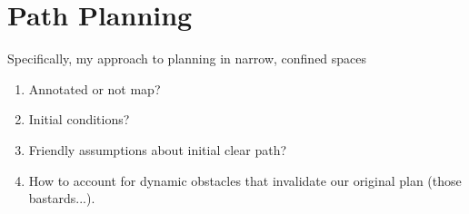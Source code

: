 \section{Path Planning}

Specifically, my approach to planning in narrow, confined spaces

\begin{enumerate}
\item Annotated or not map?
\item Initial conditions?
\item Friendly assumptions about initial clear path?
\item How to account for dynamic obstacles that invalidate our original plan (those bastards...).
\end{enumerate}
